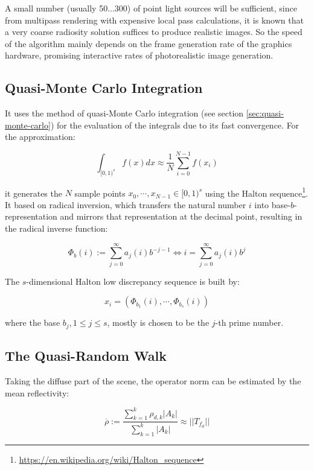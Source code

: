 A small number (usually 50...300) of point light sources will be sufficient, since from multipass rendering with expensive local pass calculations, it is known that a very coarse radiosity solution suffices to produce realistic images. So the speed of the algorithm mainly depends on the frame generation rate of the graphics hardware, promising interactive rates of photorealistic image generation.



\subsection{Quasi-Monte Carlo Integration}
It uses the method of quasi-Monte Carlo integration (see section \ref{sec:quasi-monte-carlo}) for the evaluation of the integrals due to its fast convergence. For the approximation:

\begin{equation*}
	\int_{[0,1)^{s}}f(x)dx\approx\frac{1}{N}\sum^{N-1}_{i=0}f(x_i)
\end{equation*}

it generates the $N$ sample points $x_0,\cdots ,x_{N-1}\in [0,1)^{s}$ using the Halton sequence\footnote{\url{https://en.wikipedia.org/wiki/Halton_sequence}}. It based on radical inversion, which transfers the natural number $i$ into base-$b$-representation and mirrors that representation at the decimal point, resulting in the radical inverse function:

\begin{equation*}
	\Phi_b(i):=\sum^{\infty}_{j=0}a_j(i)b^{-j-1}\Leftrightarrow i=\sum^{\infty}_{j=0}a_j(i)b^{j}
\end{equation*}


The $s$-dimensional Halton low discrepancy sequence is built by:

\begin{equation*}
	x_i=(\Phi_{b_1}(i),\cdots,\Phi_{b_s}(i))
\end{equation*}

where the base $b_j,1\leq j\leq s$, mostly is chosen to be the $j$-th prime number.




\subsection{The Quasi-Random Walk}
Taking the diffuse part of the scene, the operator norm can be estimated by the mean reflectivity:

\begin{equation*}
	\overline{\rho}:=\frac{\sum^{k}_{k=1}\rho_{d,k}|A_k|}{\sum^{k}_{k=1}|A_k|}\approx ||T_{f_d}||
\end{equation*}

